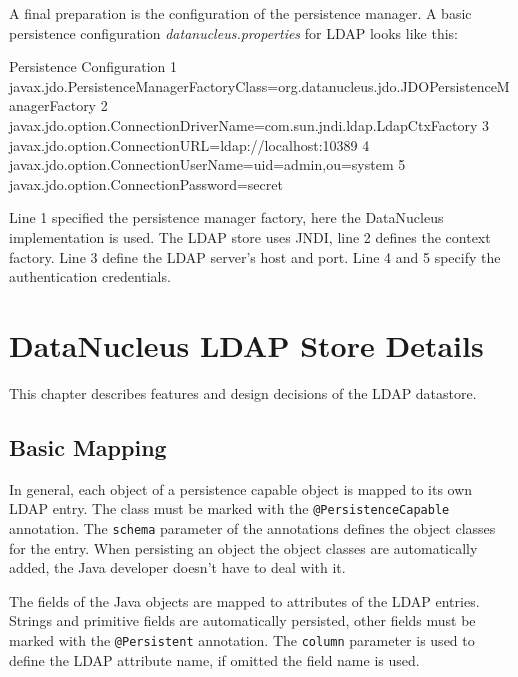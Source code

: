 \documentclass[a4paper,11pt,oneside]{article}
\begin{document}
A final preparation is the configuration of the persistence manager. A basic persistence configuration \textit{datanucleus.properties} for LDAP looks like this:
\begin{SaveVerbatim}{Persistence Configuration}
 1  javax.jdo.PersistenceManagerFactoryClass=org.datanucleus.jdo.JDOPersistenceManagerFactory
 2  javax.jdo.option.ConnectionDriverName=com.sun.jndi.ldap.LdapCtxFactory
 3  javax.jdo.option.ConnectionURL=ldap://localhost:10389
 4  javax.jdo.option.ConnectionUserName=uid=admin,ou=system
 5  javax.jdo.option.ConnectionPassword=secret
\end{SaveVerbatim}
\begin{figure}[htb]
\end{figure}

Line 1 specified the persistence manager factory, here the DataNucleus implementation is used. The LDAP store uses JNDI, line 2 defines the context factory. Line 3 define the LDAP server's host and port. Line 4 and 5 specify the authentication credentials. %

\newpage
\section{DataNucleus LDAP Store Details}

This chapter describes features and design decisions of the LDAP datastore.

\subsection{Basic Mapping}
In general, each object of a persistence capable object is mapped to its own LDAP entry. The class must be marked with the \texttt{@PersistenceCapable} annotation. The \texttt{schema} parameter of the annotations defines the object classes for the entry. When persisting an object the object classes are automatically added, the Java developer doesn't have to deal with it.

The fields of the Java objects are mapped to attributes of the LDAP entries. Strings and primitive fields are automatically persisted, other fields must be marked with the \texttt{@Persistent} annotation. The \texttt{column} parameter is used to define the LDAP attribute name, if omitted the field name is used.
\end{document}
